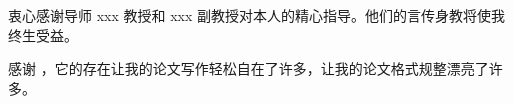 ﻿

\begin{ack}
  衷心感谢导师 xxx 教授和 xxx 副教授对本人的精心指导。他们的言传身教将使我终生受益。

  感谢 \nudtpaper{}，它的存在让我的论文写作轻松自在了许多，让我的论文格式规整漂亮了许多。

\end{ack}
